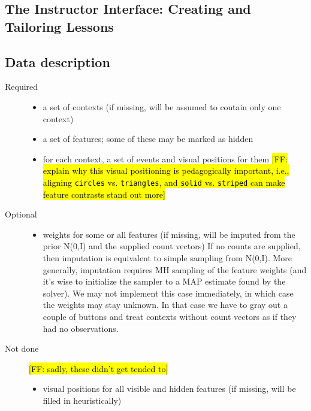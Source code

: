 \documentclass[11pt,letterpaper]{article}
\newcommand{\Note}[1]{}
\renewcommand{\Note}[1]{\hl{[#1]}}
\newcommand{\NoteSigned}[3]{{\sethlcolor{#2}\Note{#1: #3}}}
\newcommand{\NoteFF}[1]{\NoteSigned{FF}{LightBlue}{#1}}
\begin{document}
\subsection{The Instructor Interface: Creating and Tailoring Lessons}
\subsection{Data description}
\begin{description}
\item[Required]

\begin{itemize}
\item a set of contexts (if missing, will be assumed to contain only one context)
\item a set of features; some of these may be marked as hidden
\item for each context, a set of events and visual positions for them \NoteFF{explain why this visual positioning is pedagogically important, i.e., aligning \texttt{circles} vs. \texttt{triangles}, and \texttt{solid} vs. \texttt{striped} can make feature contrasts stand out more}
\end{itemize}

\item[Optional]

\begin{itemize}
\item weights for some or all features (if missing, will be imputed from the prior N(0,I) and the supplied count vectors)
If no counts are supplied, then imputation is equivalent to simple sampling from N(0,I).
More generally, imputation requires MH sampling of the feature weights (and it’s wise to initialize the sampler to a MAP estimate found by the solver).  We may not implement this case immediately, in which case the weights may stay unknown.  In that case we have to gray out a couple of buttons and treat contexts without count vectors as if they had no observations.
\end{itemize}

\item[Not done] \NoteFF{sadly, these didn't get tended to}
\begin{itemize}
\item visual positions for all visible and hidden features (if missing, will be filled in heuristically)


\end{itemize}
\end{description}
\end{document}
